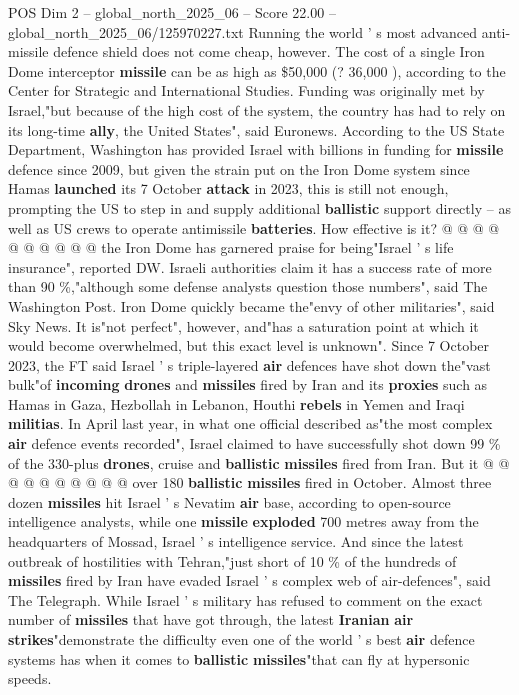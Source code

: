 \begin{textsample}{POS Dim 2 – global\_north\_2025\_06 – Score 22.00 – global\_north\_2025\_06/125970227.txt}
Running the world ' s most advanced anti-missile defence shield does not come cheap, however.
The cost of a single Iron Dome interceptor \textbf{missile} can be as high as \$50,000 (? 36,000 ), according to the Center for Strategic and International Studies.
Funding was originally met by Israel,"but because of the high cost of the system, the country has had to rely on its long-time \textbf{ally}, the United States", said Euronews.
According to the US State Department, Washington has provided Israel with billions in funding for \textbf{missile} defence since 2009, but given the strain put on the Iron Dome system since Hamas \textbf{launched} its 7 October \textbf{attack} in 2023, this is still not enough, prompting the US to step in and supply additional \textbf{ballistic} support directly -- as well as US crews to operate antimissile \textbf{batteries}.
How effective is it? @ @ @ @ @ @ @ @ @ @ the Iron Dome has garnered praise for being"Israel ' s life insurance", reported DW.
Israeli authorities claim it has a success rate of more than 90 \%,"although some defense analysts question those numbers", said The Washington Post.
Iron Dome quickly became the"envy of other militaries", said Sky News.
It is"not perfect", however, and"has a saturation point at which it would become overwhelmed, but this exact level is unknown".
Since 7 October 2023, the FT said Israel ' s triple-layered \textbf{air} defences have shot down the"vast bulk"of \textbf{incoming} \textbf{drones} and \textbf{missiles} fired by Iran and its \textbf{proxies} such as Hamas in Gaza, Hezbollah in Lebanon, Houthi \textbf{rebels} in Yemen and Iraqi \textbf{militias}.
In April last year, in what one official described as"the most complex \textbf{air} defence events recorded", Israel claimed to have successfully shot down 99 \% of the 330-plus \textbf{drones}, cruise and \textbf{ballistic} \textbf{missiles} fired from Iran.
But it @ @ @ @ @ @ @ @ @ @ over 180 \textbf{ballistic} \textbf{missiles} fired in October.
Almost three dozen \textbf{missiles} hit Israel ' s Nevatim \textbf{air} base, according to open-source intelligence analysts, while one \textbf{missile} \textbf{exploded} 700 metres away from the headquarters of Mossad, Israel ' s intelligence service.
And since the latest outbreak of hostilities with Tehran,"just short of 10 \% of the hundreds of \textbf{missiles} fired by Iran have evaded Israel ' s complex web of air-defences", said The Telegraph.
While Israel ' s military has refused to comment on the exact number of \textbf{missiles} that have got through, the latest \textbf{Iranian} \textbf{air} \textbf{strikes}"demonstrate the difficulty even one of the world ' s best \textbf{air} defence systems has when it comes to \textbf{ballistic} \textbf{missiles}"that can fly at hypersonic speeds.

\end{textsample}
